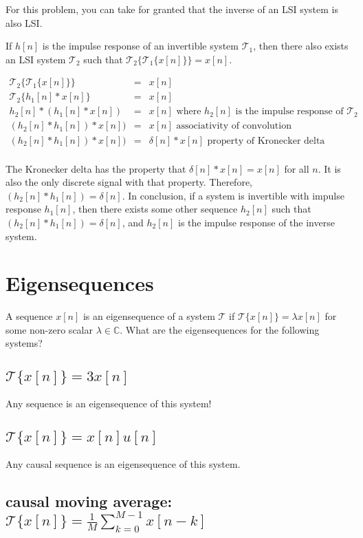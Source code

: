 \documentclass[11pt]{article}
\begin{document}
{\color{blue}
For this problem, you can take for granted that the inverse of an LSI system is also LSI.

If $h[n]$ is the impulse response of an invertible system $\mathcal{T}_1$, then there also exists an LSI system $\mathcal{T}_2$ such that $\mathcal{T}_2\{\mathcal{T}_1\{x[n]\}\} = x[n]$. 

\begin{eqnarray*}
\mathcal{T}_2\{\mathcal{T}_1\{x[n]\}\} &=& x[n] \\
\mathcal{T}_2\{h_1[n]*x[n]\} &=& x[n] \\
h_2[n]*(h_1[n]*x[n]) &=& x[n] \text{ where $h_2[n]$ is the impulse response of $\mathcal{T_2}$}\\
(h_2[n]*h_1[n])*x[n]) &=& x[n] \text{ associativity of convolution}\\
(h_2[n]*h_1[n])*x[n]) &=& \delta[n]*x[n] \text{ property of Kronecker delta}\\
\end{eqnarray*}

The Kronecker delta has the property that $\delta[n]*x[n]=x[n]$ for all $n$. It is also the only discrete signal with that property. Therefore, $(h_2[n]*h_1[n])=\delta[n]$. In conclusion, if a system is invertible with impulse response $h_1[n]$, then there exists some other sequence $h_2[n]$ such that $(h_2[n]*h_1[n])=\delta[n]$, and $h_2[n]$ is the impulse response of the inverse system.
}

\section{Eigensequences}
A sequence $x[n]$ is an eigensequence of a system $\mathcal{T}$ if $\mathcal{T}\{x[n]\}=\lambda x[n]$ for some non-zero scalar $\lambda \in \mathbb{C}$. What are the eigensequences for the following systems?
\subsection{$\mathcal{T}\{x[n]\}=3x[n]$}

{\color{blue}
Any sequence is an eigensequence of this system!
}

\subsection{$\mathcal{T}\{x[n]\}=x[n]u[n]$}
{\color{blue}
Any causal sequence is an eigensequence of this system.
}

\subsection{causal moving average: $\mathcal{T}\{x[n]\}=\frac{1}{M}\sum\limits_{k=0}^{M-1} x[n-k]$}
\end{document}
